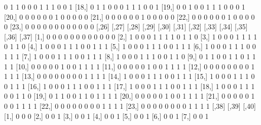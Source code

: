 \documentclass[a4paper]{article}
\begin{document}
\begin{Schunk}
\begin{Soutput}
[17,]     0     1     1     0     0     0     1     1     1     0     0     1
[18,]     0     1     1     0     0     0     1     1     1     0     0     1
[19,]     0     0     1     0     0     1     1     1     0     0     0     1
[20,]     0     0     0     0     0     0     1     0     0     0     0     0
[21,]     0     0     0     0     0     0     1     0     0     0     0     0
[22,]     0     0     0     0     0     0     1     0     0     0     0     0
[23,]     0     0     0     0     0     0     0     0     0     0     0     0
      [,26] [,27] [,28] [,29] [,30] [,31] [,32] [,33] [,34] [,35] [,36] [,37]
 [1,]     0     0     0     0     0     0     0     0     0     0     0     0
 [2,]     1     0     0     0     1     1     1     1     0     1     1     0
 [3,]     1     0     0     0     1     1     1     1     0     1     1     0
 [4,]     1     0     0     0     1     1     1     0     0     1     1     1
 [5,]     1     0     0     0     1     1     1     0     0     1     1     1
 [6,]     1     0     0     0     1     1     1     0     0     1     1     1
 [7,]     1     0     0     0     1     1     1     0     0     1     1     1
 [8,]     1     0     0     0     1     1     1     0     0     1     1     0
 [9,]     0     1     1     0     0     1     1     0     1     1     1     1
[10,]     0     0     0     0     0     1     0     0     1     1     1     1
[11,]     0     0     0     0     0     1     0     0     1     1     1     1
[12,]     0     0     0     0     0     0     0     0     1     1     1     1
[13,]     0     0     0     0     0     0     0     0     1     1     1     1
[14,]     1     0     0     0     1     1     1     0     0     1     1     1
[15,]     1     0     0     0     1     1     1     0     0     1     1     1
[16,]     1     0     0     0     1     1     1     0     0     1     1     1
[17,]     1     0     0     0     1     1     1     0     0     1     1     1
[18,]     1     0     0     0     1     1     1     0     0     1     1     0
[19,]     0     1     1     0     0     1     1     0     1     1     1     1
[20,]     0     0     0     0     0     1     0     0     1     1     1     1
[21,]     0     0     0     0     0     1     0     0     1     1     1     1
[22,]     0     0     0     0     0     0     0     0     1     1     1     1
[23,]     0     0     0     0     0     0     0     0     1     1     1     1
      [,38] [,39] [,40]
 [1,]     0     0     0
 [2,]     0     0     1
 [3,]     0     0     1
 [4,]     0     0     1
 [5,]     0     0     1
 [6,]     0     0     1
 [7,]     0     0     1

\end{Soutput}
\end{Schunk}
\end{document}

